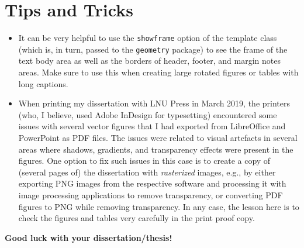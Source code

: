 \documentclass[10pt,a4paper]{article}
\begin{document}
\section{Tips and Tricks}
\begin{itemize}
\item It can be very helpful to use the \texttt{showframe} option of the template class (which is, in turn, passed to the \texttt{geometry} package) to see the frame of the text body area as well as the borders of header, footer, and margin notes areas. 
Make sure to use this when creating large rotated figures or tables with long captions. 
\item When printing my dissertation with LNU Press in March 2019, the printers (who, I believe, used Adobe InDesign for typesetting) encountered some issues with several vector figures that I had exported from LibreOffice and PowerPoint as PDF files. 
The issues were related to visual artefacts in several areas where shadows, gradients, and transparency effects were present in the figures. 
One option to fix such issues in this case is to create a copy of (several pages of) the dissertation with \emph{rasterized} images, e.g., by either exporting PNG images from the respective software and processing it with image processing applications to remove transparency, or converting PDF figures to PNG while removing transparency. 
In any case, the lesson here is to check the figures and tables very carefully in the print proof copy. 
\end{itemize}

\begin{center}
\textbf{Good luck with your dissertation/thesis!}%
\end{center}
\end{document}
